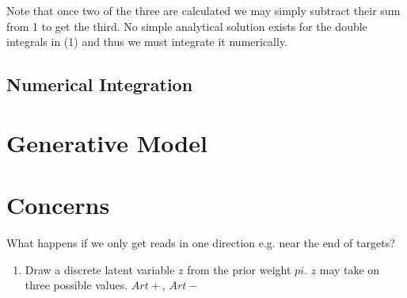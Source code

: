\documentclass[a4paper]{article}
\begin{document}
Note that once two of the three are calculated we may simply subtract their sum from 1 to get the third. No simple analytical solution exists for the double integrals in (1) and thus we must integrate it numerically.

\subsection{Numerical Integration}

\section{Generative Model}

\section{Concerns}
What happens if we only get reads in one direction e.g. near the end of targets?


\begin{enumerate}
\item Draw a discrete latent variable $z$ from the prior weight $pi$. $z$ may take on three possible values. $Art+$, $Art-$
\end{enumerate}
\end{document}

